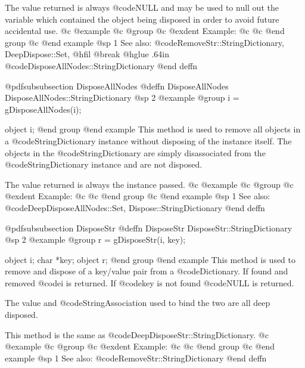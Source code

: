 The value returned is always @code{NULL} and may be used to null out
the variable which contained the object being disposed in order to
avoid future accidental use.
@c @example
@c @group
@c @exdent Example:
@c 
@c @end group
@c @end example
@sp 1
See also:  @code{RemoveStr::StringDictionary, DeepDispose::Set,}
@hfil @break @hglue .64in      @code{DisposeAllNodes::StringDictionary}
@end deffn

















@pdfsubsubsection {DisposeAllNodes}
@deffn {DisposeAllNodes} DisposeAllNodes::StringDictionary
@sp 2
@example
@group
i = gDisposeAllNodes(i);

object  i;
@end group
@end example
This method is used to remove all objects in a @code{StringDictionary}
instance without disposing of the instance itself.  The objects in the
@code{StringDictionary} are simply disassociated from the
@code{StringDictionary} instance and are not disposed.

The value returned is always the instance passed.
@c @example
@c @group
@c @exdent Example:
@c 
@c @end group
@c @end example
@sp 1
See also:  @code{DeepDisposeAllNodes::Set, Dispose::StringDictionary}
@end deffn

















@pdfsubsubsection {DisposeStr}
@deffn {DisposeStr} DisposeStr::StringDictionary
@sp 2
@example
@group
r = gDisposeStr(i, key);

object  i;
char    *key;
object  r;
@end group
@end example
This method is used to remove and dispose of a key/value pair from a
@code{Dictionary}.  If found and removed @code{i} is returned.  If @code{key}
is not found @code{NULL} is returned.

The value and @code{StringAssociation} used to bind the two are all deep
disposed.

This method is the same as @code{DeepDisposeStr::StringDictionary}.
@c @example
@c @group
@c @exdent Example:
@c 
@c @end group
@c @end example
@sp 1
See also:  @code{RemoveStr::StringDictionary}
@end deffn














